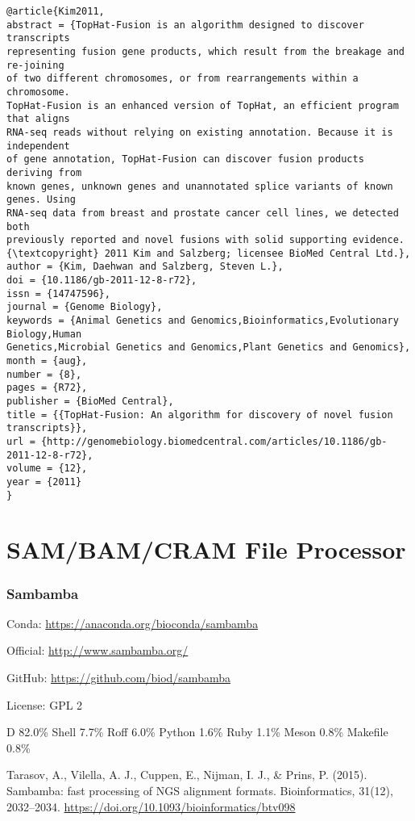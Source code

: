 \documentclass[]{article}
\begin{document}
\begin{verbatim}
@article{Kim2011,
abstract = {TopHat-Fusion is an algorithm designed to discover transcripts
representing fusion gene products, which result from the breakage and re-joining
of two different chromosomes, or from rearrangements within a chromosome.
TopHat-Fusion is an enhanced version of TopHat, an efficient program that aligns
RNA-seq reads without relying on existing annotation. Because it is independent
of gene annotation, TopHat-Fusion can discover fusion products deriving from
known genes, unknown genes and unannotated splice variants of known genes. Using
RNA-seq data from breast and prostate cancer cell lines, we detected both
previously reported and novel fusions with solid supporting evidence.
{\textcopyright} 2011 Kim and Salzberg; licensee BioMed Central Ltd.},
author = {Kim, Daehwan and Salzberg, Steven L.},
doi = {10.1186/gb-2011-12-8-r72},
issn = {14747596},
journal = {Genome Biology},
keywords = {Animal Genetics and Genomics,Bioinformatics,Evolutionary Biology,Human
Genetics,Microbial Genetics and Genomics,Plant Genetics and Genomics},
month = {aug},
number = {8},
pages = {R72},
publisher = {BioMed Central},
title = {{TopHat-Fusion: An algorithm for discovery of novel fusion transcripts}},
url = {http://genomebiology.biomedcentral.com/articles/10.1186/gb-2011-12-8-r72},
volume = {12},
year = {2011}
}

\end{verbatim}

\part{SAM/BAM/CRAM File Processor}

\section{Sambamba}

Conda: \url{https://anaconda.org/bioconda/sambamba}

Official: \url{http://www.sambamba.org/}

GitHub: \url{https://github.com/biod/sambamba}

License: GPL 2

D 82.0\% Shell 7.7\% Roff 6.0\% Python 1.6\% Ruby 1.1\% Meson 0.8\% Makefile 0.8\%


Tarasov, A., Vilella, A. J., Cuppen, E., Nijman, I. J., \& Prins, P. (2015). Sambamba: fast processing of NGS alignment formats. Bioinformatics, 31(12), 2032–2034. \url{https://doi.org/10.1093/bioinformatics/btv098}
\end{document}
